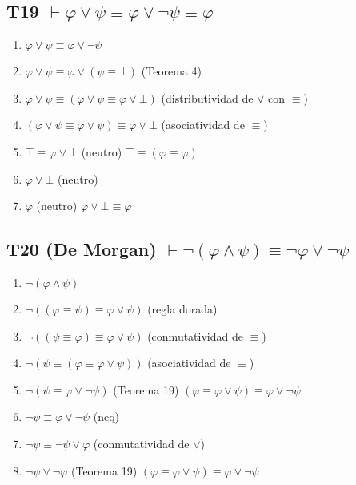 \subsection{T19 $\vdash \varphi \lor \psi \equiv \varphi \lor \neg\psi \equiv \varphi $}

\begin{enumerate}
    \item $\varphi \lor \psi \equiv \varphi \lor \neg\psi$
    \item $\varphi \lor \psi \equiv \varphi \lor (\psi \equiv \bot)$ \hfill (Teorema 4)
    \item $\varphi \lor \psi \equiv (\varphi \lor \psi \equiv \varphi \lor \bot)$ \hfill (distributividad de $\lor$ con $\equiv$)
    \item $(\varphi \lor \psi \equiv \varphi \lor \psi) \equiv \varphi \lor \bot$ \hfill (asociatividad de $\equiv$)
    \item $\top \equiv \varphi \lor \bot$ \hfill (neutro) $\top \equiv (\varphi \equiv \varphi)$
    \item $\varphi \lor \bot$ \hfill (neutro)
    \item $\varphi$ \hfill (neutro) $\varphi \lor \bot \equiv \varphi$
\end{enumerate}

\subsection{T20 (De Morgan) $\vdash \neg(\varphi \land \psi) \equiv \neg\varphi \lor \neg\psi$}

\begin{enumerate}
    \item $\neg(\varphi \land \psi)$
    \item $\neg((\varphi \equiv \psi) \equiv \varphi \lor \psi)$ \hfill (regla dorada)
    \item $\neg((\psi \equiv \varphi) \equiv \varphi \lor \psi)$ \hfill (conmutatividad de $\equiv$)
    \item $\neg(\psi \equiv (\varphi \equiv \varphi \lor \psi))$ \hfill (asociatividad de $\equiv$)
    \item $\neg(\psi \equiv \varphi \lor \neg\psi)$ \hfill (Teorema 19) $(\varphi \equiv \varphi \lor \psi) \equiv \varphi \lor \neg\psi$

    \item $\neg\psi \equiv \varphi \lor \neg\psi$ \hfill (neq)
    \item $\neg\psi \equiv \neg\psi \lor \varphi$ \hfill (conmutatividad de $\lor$)
    \item $\neg\psi \lor \neg\varphi$ \hfill (Teorema 19) $(\varphi \equiv \varphi \lor \psi) \equiv \varphi \lor \neg\psi$


\end{enumerate}

